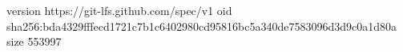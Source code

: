 version https://git-lfs.github.com/spec/v1
oid sha256:bda4329fffecd1721c7b1c6402980cd95816bc5a340de7583096d3d9c0a1d80a
size 553997
